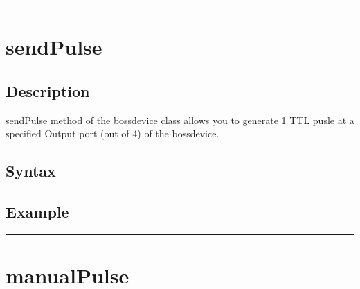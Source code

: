 \documentclass[letterpaper,10pt,english]{sphinxmanual}
\begin{document}
\bigskip\hrule\bigskip



\section{sendPulse}
\label{\detokenize{4_api_documentation:sendpulse}}

\subsection{Description}
\label{\detokenize{4_api_documentation:id1}}
\sphinxAtStartPar
sendPulse method of the bossdevice class allows you to generate 1 TTL pusle at a specified Output port (out of 4) of the bossdevice.


\subsection{Syntax}
\label{\detokenize{4_api_documentation:id2}}
\begin{sphinxVerbatim}[commandchars=\\\{\}]
\PYG{p}{[}\PYG{p}{]}
\end{sphinxVerbatim}


\subsection{Example}
\label{\detokenize{4_api_documentation:id3}}
\begin{sphinxVerbatim}[commandchars=\\\{\}]
\end{sphinxVerbatim}


\bigskip\hrule\bigskip



\section{manualPulse}
\label{\detokenize{4_api_documentation:manualpulse}}
\end{document}
